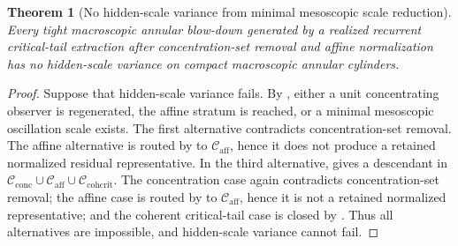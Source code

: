 \documentclass[11pt]{amsart}
\numberwithin{equation}{section}
\theoremstyle{plain}
\newtheorem{theorem}{Theorem}[section]
\theoremstyle{definition}
\theoremstyle{remark}
\newcommand{\Cactive}{\mathcal C_{\mathrm{conc}}}
\newcommand{\Caff}{\mathcal C_{\mathrm{aff}}}
\newcommand{\Ccohcrit}{\mathcal C_{\mathrm{cohcrit}}}
\begin{document}
\begin{theorem}[No hidden-scale variance from minimal mesoscopic scale reduction]
\label{thm:no-hidden-scale-variance-realized-defects}
Every tight macroscopic
annular blow-down generated by a realized recurrent critical-tail extraction
after concentration-set removal and affine normalization has no hidden-scale variance
on compact macroscopic annular cylinders.
\end{theorem}

\begin{proof}
Suppose that hidden-scale variance fails.  By
, either a unit concentrating observer is
regenerated, the affine stratum is reached, or a minimal mesoscopic oscillation scale
exists.  The first alternative contradicts concentration-set removal.  The affine
alternative is routed by  to
\(\Caff\), hence it does not produce a retained normalized residual
representative.  In the
third alternative,
 gives a descendant in
\(\Cactive\cup\Caff\cup\Ccohcrit\).  The concentration case again contradicts
concentration-set removal; the affine case is routed by
 to \(\Caff\), hence it is not a
retained normalized representative; and
the coherent critical-tail case is closed by
.  Thus all
alternatives are impossible, and hidden-scale variance cannot fail.
\end{proof}
\end{document}
